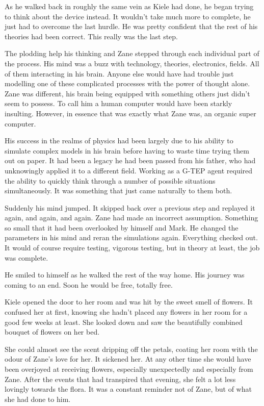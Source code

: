 As he walked back in roughly the same vein as Kiele had done, he began trying to think about the device instead.  It wouldn't take much more to complete, he just had to overcome the last hurdle.  He was pretty confident that the rest of his theories had been correct.  This really was the last step.

The plodding help his thinking and Zane stepped through each individual part of the process.  His mind was a buzz with technology, theories, electronics, fields.  All of them interacting in his brain.  Anyone else would have had trouble just modelling one of these complicated processes with the power of thought alone.  Zane was different, his brain being equipped with something others just didn't seem to possess.  To call him a human computer would have been starkly insulting.  However, in essence that was exactly what Zane was, an organic super computer.  

His success in the realms of physics had been largely due to his ability to simulate complex models in his brain before having to waste time trying them out on paper.  It had been a legacy he had been passed from his father, who had unknowingly applied it to a different field.  Working as a G-TEP agent required the ability to quickly think through a number of possible situations simultaneously.  It was something that just came naturally to them both.

Suddenly his mind jumped.  It skipped back over a previous step and replayed it again, and again, and again.  Zane had made an incorrect assumption.  Something so small that it had been overlooked by himself and Mark.  He changed the parameters in his mind and reran the simulations again.  Everything checked out.  It would of course require testing, vigorous testing, but in theory at least, the job was complete.

He smiled to himself as he walked the rest of the way home.  His journey was coming to an end.  Soon he would be free, totally free.  



\thoughtbreak



Kiele opened the door to her room and was hit by the sweet smell of flowers.  It confused her at first, knowing she hadn't placed any flowers in her room for a good few weeks at least.  She looked down and saw the beautifully combined bouquet of flowers on her bed.

She could almost see the scent dripping off the petals, coating her room with the odour of Zane's love for her.  It sickened her.  At any other time she would have been overjoyed at receiving flowers, especially unexpectedly and especially from Zane.  After the events that had transpired that evening, she felt a lot less lovingly towards the flora.  It was a constant reminder not of Zane, but of what she had done to him.

